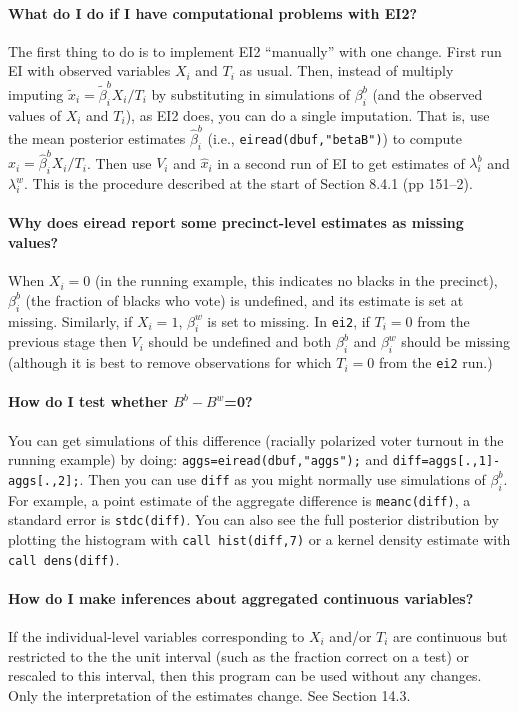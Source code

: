 \documentclass[11pt,titlepage]{article}
\begin{document}
\paragraph{What do I do if I have computational problems with EI2?}
The first thing to do is to implement EI2 ``manually'' with one
change.  First run EI with observed variables $X_i$ and $T_i$ as
usual.  Then, instead of multiply imputing
$\tilde{x}_i=\tilde{\beta}_i^bX_i/T_i$ by substituting in simulations
of $\beta_i^b$ (and the observed values of $X_i$ and $T_i$), as EI2
does, you can do a single imputation.  That is, use the mean posterior
estimates $\hat\beta_i^b$ (i.e., \texttt{eiread(dbuf,"betaB")}) to
compute $\hat x_i=\hat\beta_i^bX_i/T_i$.  Then use $V_i$ and $\hat
x_i$ in a second run of EI to get estimates of $\lambda_i^b$ and
$\lambda_i^w$.  This is the procedure described at the start of
Section 8.4.1 (pp 151--2).

\paragraph{Why does eiread report some precinct-level estimates
  as missing values?}  When $X_i=0$ (in the running example, this
indicates no blacks in the precinct), $\beta_i^b$ (the fraction of
blacks who vote) is undefined, and its estimate is set at missing.
Similarly, if $X_i=1$, $\beta_i^w$ is set to missing.  In
\texttt{ei2}, if $T_i=0$ from the previous stage then $V_i$ should be
undefined and both $\beta_i^b$ and $\beta_i^w$ should be missing
(although it is best to remove observations for which $T_i=0$ from the
\texttt{ei2} run.)

\paragraph{How do I test whether $B^b-B^w$=0?} You can get simulations
of this difference (racially polarized voter turnout in the running
example) by doing: \texttt{aggs=eiread(dbuf,"aggs");} and
\texttt{diff=aggs[.,1]-aggs[.,2];}.  Then you can use \texttt{diff} as
you might normally use simulations of $\beta_i^b$.  For example, a
point estimate of the aggregate difference is \texttt{meanc(diff)}, a
standard error is \texttt{stdc(diff)}.  You can also see the full
posterior distribution by plotting the histogram with \texttt{call
  hist(diff,7)} or a kernel density estimate with \texttt{call
  dens(diff)}.

\paragraph{How do I make inferences about aggregated continuous variables?}
If the individual-level variables corresponding to $X_i$ and/or $T_i$
are continuous but restricted to the the unit interval (such as the
fraction correct on a test) or rescaled to this interval, then this
program can be used without any changes.  Only the interpretation of
the estimates change.  See Section 14.3.
\end{document}
